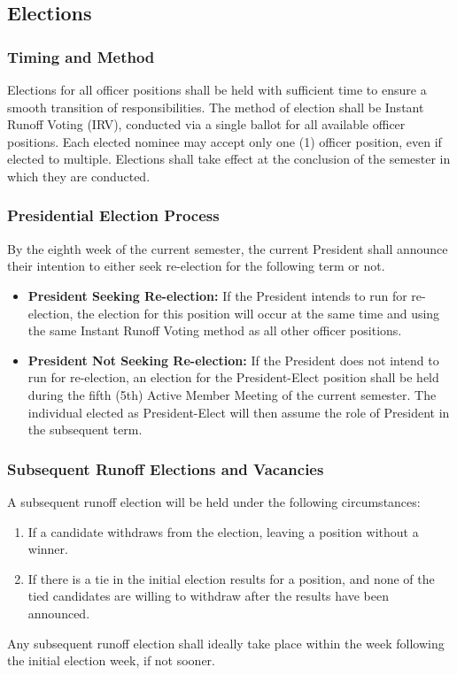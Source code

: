 \documentclass[10pt, oneside]{article}
\begin{document}
\subsection{Elections}

\subsubsection{Timing and Method}
Elections for all officer positions shall be held with sufficient time to ensure a smooth transition of responsibilities. The method of election shall be Instant Runoff Voting (IRV), conducted via a single ballot for all available officer positions. Each elected nominee may accept only one (1) officer position, even if elected to multiple. Elections shall take effect at the conclusion of the semester in which they are conducted.

\subsubsection{Presidential Election Process}
By the eighth week of the current semester, the current President shall announce their intention to either seek re-election for the following term or not.
\begin{itemize}
    \item \textbf{President Seeking Re-election:} If the President intends to run for re-election, the election for this position will occur at the same time and using the same Instant Runoff Voting method as all other officer positions.
    \item \textbf{President Not Seeking Re-election:} If the President does not intend to run for re-election, an election for the President-Elect position shall be held during the fifth (5th) Active Member Meeting of the current semester. The individual elected as President-Elect will then assume the role of President in the subsequent term.
\end{itemize}

\subsubsection{Subsequent Runoff Elections and Vacancies}
A subsequent runoff election will be held under the following circumstances:
\begin{enumerate}[label=\alph*.]
    \item If a candidate withdraws from the election, leaving a position without a winner.
    \item If there is a tie in the initial election results for a position, and none of the tied candidates are willing to withdraw after the results have been announced.
\end{enumerate}
Any subsequent runoff election shall ideally take place within the week following the initial election week, if not sooner.
\end{document}
